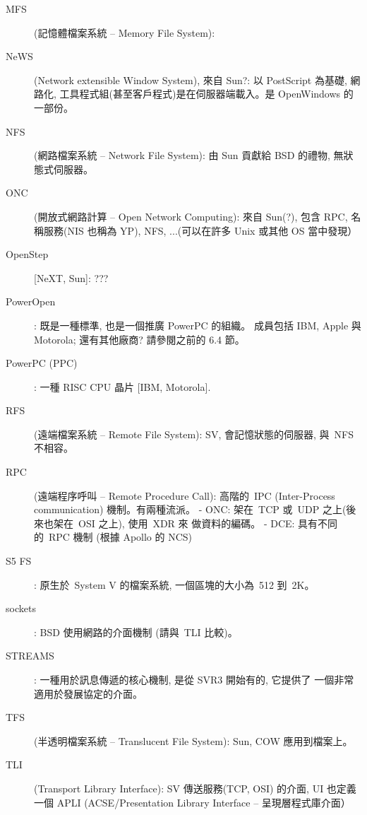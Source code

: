 \documentclass{article}
\begin{document}
\begin{CJK*}{Bg5}{ming}
\begin{description}
    \item [MFS](記憶體檔案系統 -- Memory File System):

    \item [NeWS](Network extensible Window System), 來自 Sun?: 以 PostScript 為基礎,
         網路化, 工具程式組(甚至客戶程式)是在伺服器端載入。是 OpenWindows 的
         一部份。

    \item [NFS] (網路檔案系統 -- Network File System):  由 Sun 貢獻給 BSD 的禮物,
         無狀態式伺服器。

    \item [ONC] (開放式網路計算 -- Open Network Computing): 來自 Sun(?), 包含 RPC, 
        名稱服務(NIS 也稱為 YP), NFS, ...(可以在許多 Unix 或其他 OS 當中發現）

    \item [OpenStep] [NeXT, Sun]: ???

    \item [PowerOpen]: 既是一種標準, 也是一個推廣 PowerPC 的組織。
         成員包括 IBM, Apple 與 Motorola; 還有其他廠商?
         請參閱之前的 6.4 節。

    \item [PowerPC (PPC)]: 一種 RISC CPU 晶片 [IBM, Motorola].

    \item [RFS] (遠端檔案系統 -- Remote File System):  SV, 會記憶狀態的伺服器,
         與~NFS 不相容。

    \item [RPC] (遠端程序呼叫 -- Remote Procedure Call): 高階的~IPC (Inter-Process
         communication) 機制。有兩種流派。
         - ONC: 架在~TCP 或~UDP 之上(後來也架在~OSI 之上), 使用~XDR 來
           做資料的編碼。
         - DCE: 具有不同的~RPC 機制 (根據 Apollo 的 NCS)

    \item [S5 FS]:  原生於~System V 的檔案系統, 一個區塊的大小為~512 到~2K。

    \item [sockets]:  BSD 使用網路的介面機制 (請與~TLI 比較)。

    \item [STREAMS]:  一種用於訊息傳遞的核心機制, 是從 SVR3 開始有的, 它提供了
         一個非常適用於發展協定的介面。

    \item [TFS] (半透明檔案系統 -- Translucent File System): Sun, COW 應用到檔案上。

    \item [TLI] (Transport Library Interface):  SV 傳送服務(TCP, OSI) 的介面,
         UI 也定義一個 APLI (ACSE/Presentation Library Interface --
         呈現層程式庫介面）


\end{description}
\end{CJK*}
\end{document}
